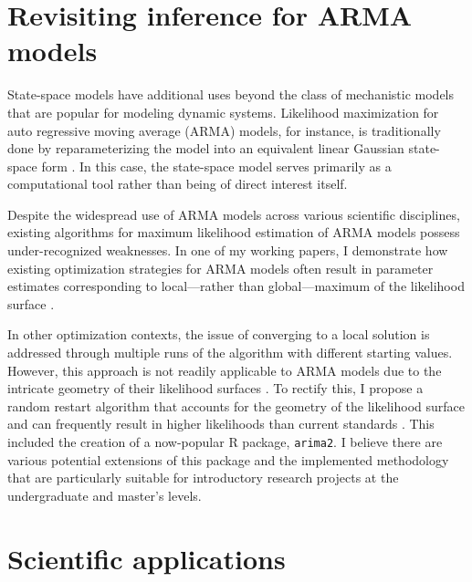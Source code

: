 \documentclass{article}
\begin{document}
\section{Revisiting inference for ARMA models}

State-space models have additional uses beyond the class of mechanistic models that are popular for modeling dynamic systems.
Likelihood maximization for auto regressive moving average (ARMA) models, for instance, is traditionally done by reparameterizing the model into an equivalent linear Gaussian state-space form \cite{gardner80, durbin12}.
In this case, the state-space model serves primarily as a computational tool rather than being of direct interest itself.

Despite the widespread use of ARMA models across various scientific disciplines, existing algorithms for maximum likelihood estimation of ARMA models possess under-recognized weaknesses.
In one of my working papers, I demonstrate how existing optimization strategies for ARMA models often result in parameter estimates corresponding to local---rather than global---maximum of the likelihood surface \cite{wheelerARMA}.

In other optimization contexts, the issue of converging to a local solution is addressed through multiple runs of the algorithm with different starting values.
However, this approach is not readily applicable to ARMA models due to the intricate geometry of their likelihood surfaces \cite{ripley2002}.
To rectify this, I propose a random restart algorithm that accounts for the geometry of the likelihood surface and can frequently result in higher likelihoods than current standards \cite{wheelerARMA}.
This included the creation of a now-popular R package, \texttt{arima2}.
I believe there are various potential extensions of this package and the implemented methodology that are particularly suitable for introductory research projects at the undergraduate and master's levels.

\section{Scientific applications}
\end{document}
